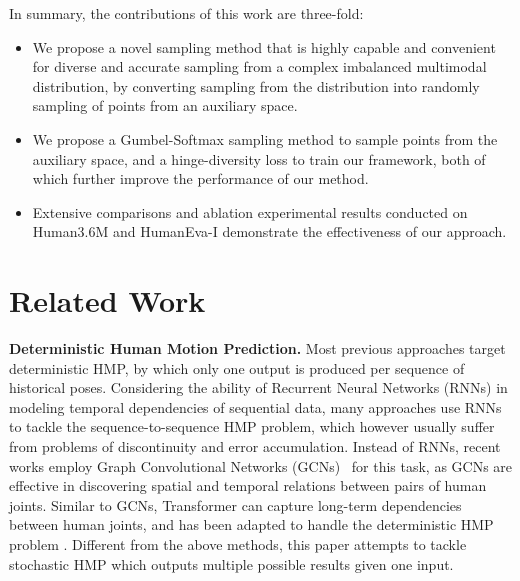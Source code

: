 \documentclass[sigconf,screen,nonacm]{acmart}
\begin{document}
	In summary, the contributions of this work are three-fold:
	\begin{itemize}
		\item We propose a novel sampling method that is highly capable and convenient for diverse and accurate sampling from a complex imbalanced multimodal distribution, by converting sampling from the distribution into randomly sampling of points from an auxiliary space.
		\item We propose a Gumbel-Softmax sampling method to sample points from the auxiliary space, and a hinge-diversity loss to train our framework, both of which further improve the performance of our method.
		\item Extensive comparisons and ablation experimental results conducted on Human3.6M \cite{ionescu2013human3} and HumanEva-I \cite{sigal2010humaneva} demonstrate the effectiveness of our approach.
	\end{itemize}
	
	
	\section{Related Work}
	
	\textbf{Deterministic Human Motion Prediction.} Most previous approaches target deterministic HMP, by which only one output is produced per sequence of historical poses. Considering the ability of Recurrent Neural Networks (RNNs) in modeling temporal dependencies of sequential data, many approaches \cite{martinez2017human, song2017end, sang2020human, chiu2019action, corona2020context, aksan2019structured, li2017auto, fragkiadaki2015recurrent, liu2022investigating} use RNNs to tackle the sequence-to-sequence HMP problem, which however usually suffer from problems of discontinuity and error accumulation. Instead of RNNs, recent works \cite{mao2019learning, mao2020history, li2020dynamic, li2021symbiotic, cui2020learning, dang2021msr, cui2021towards, li2020multitask, liu2021motion, mao2021multi, Ma_2022_CVPR} employ Graph Convolutional Networks (GCNs)~\cite{Shi:CVPR2021, Duan:AAAI2022, Shi:AAAI2022} for this task, as GCNs are effective in discovering spatial and temporal relations between pairs of human joints. Similar to GCNs, Transformer \cite{vaswani2017attention, Dong:MM2021} can capture long-term dependencies between human joints, and has been adapted to handle the deterministic HMP problem \cite{cai2020learning, aksan2021spatio, martinez2021pose, aksan2020attention}. Different from the above methods, this paper attempts to tackle stochastic HMP which outputs multiple possible results given one input.
\end{document}
